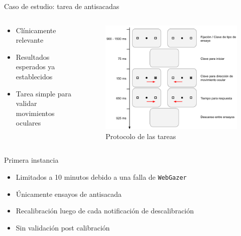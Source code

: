 \documentclass[aspectratio=169]{beamer}
\begin{document}
\begin{frame}{Caso de estudio: tarea de antisacadas}

  \begin{columns}
    \begin{column}{.5\textwidth}
      \begin{itemize}
        \item Clínicamente relevante
        \item Resultados esperados ya establecidos
        \item Tarea simple para validar movimientos oculares
      \end{itemize}
    \end{column}
    \begin{column}{.5\textwidth}
      \begin{figure}
        \centering
        \includegraphics[width=\linewidth]{img/antisaccades-protocol.png}
        \caption{Protocolo de las tareas}
      \end{figure}
    \end{column}
  \end{columns}

\end{frame}

\begin{frame}{Primera instancia}
  \begin{itemize}
    \item Limitados a 10 minutos debido a una falla de \texttt{WebGazer}
    \item Únicamente ensayos de antisacada
    \item Recalibración luego de cada notificación de descalibración
    \item Sin validación post calibración
  \end{itemize}
\end{frame}
\end{document}
